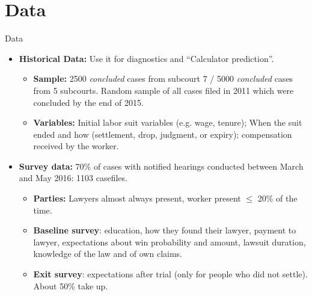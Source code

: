 \documentclass[9pt]{beamer}
\begin{document}
\section{Data}

\begin{frame}{Data}{}
   \begin{itemize}

        \item \textbf{Historical Data:} Use it for diagnostics and \alert{``Calculator prediction''}.
        \vspace{0.05in}
            \begin{itemize}
                \item \textbf{Sample:} 2500 \textit{concluded} cases from subcourt 7 / 5000 \textit{concluded} cases from 5 subcourts. Random sample of all cases filed in 2011  which were concluded by the end of 2015.
                \vspace{0.05in}
                    
                \item \textbf{Variables:} Initial labor suit variables (e.g. wage, tenure); When the suit ended and how (settlement, drop, judgment, or expiry); compensation received by the worker.
            \end{itemize}
            \vspace{0.1in}
        \item \textbf{Survey data:} 70\% of cases with notified hearings conducted between March and May 2016: 1103 casefiles.
        \vspace{0.05in}
            \begin{itemize}
                \item \textbf{Parties:} Lawyers almost always present, worker present $\leq$ 20\% of the time. 
                \vspace{0.05in}
                \item \textbf{Baseline survey}: education, how they found their lawyer, payment to lawyer, expectations about win probability and amount, lawsuit duration, knowledge of the law and of own claims.
                \vspace{0.05in}
                \item \textbf{Exit survey}: expectations after trial (\alert{only for people who did not settle}). About \alert{50\%} take up.
            \end{itemize}
   \end{itemize}
\end{frame}
\end{document}
